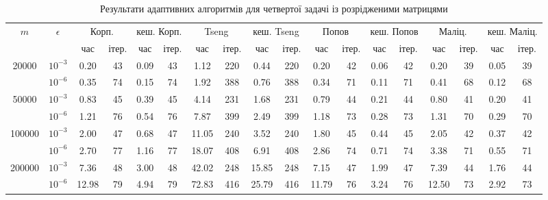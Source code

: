 \begin{table}[H]
    \centering
    \begin{tabular}{||c|c||c|c|c|c||c|c|c|c||c|c|c|c||c|c|c|c||} \hline \hline
        \multirow{2}{*}{$m$} & \multirow{2}{*}{$\epsilon$} & \multicolumn{2}{c|}{Корп.} & \multicolumn{2}{c||}{кеш. Корп.} & \multicolumn{2}{c|}{Tseng} & \multicolumn{2}{c||}{кеш. Tseng} & \multicolumn{2}{c|}{Попов} & \multicolumn{2}{c||}{кеш. Попов} & \multicolumn{2}{c|}{Маліц.} & \multicolumn{2}{c||}{кеш. Маліц.} \\ \cline{3-18}
        & & час & ітер. & час & ітер. & час & ітер. & час & ітер. & час & ітер. & час & ітер. & час & ітер. & час & ітер. \\ \hline \hline
        \multirow{2}{*}{20000} & $10^{-3}$ & 0.20 & 43 & 0.09 & 43 & 1.12 & 220 & 0.44 & 220 & 0.20 & 42 & 0.06 & 42 & 0.20 & 39 & 0.05 & 39 \\ \cline{2-18}
        & $10^{-6}$ & 0.35 & 74 & 0.15 & 74 & 1.92 & 388 & 0.76 & 388 & 0.34 & 71 & 0.11 & 71 & 0.41 & 68 & 0.12 & 68 \\ \hline
        \multirow{2}{*}{50000} & $10^{-3}$ & 0.83 & 45 & 0.39 & 45 & 4.14 & 231 & 1.68 & 231 & 0.79 & 44 & 0.21 & 44 & 0.80 & 41 & 0.20 & 41 \\ \cline{2-18}
        & $10^{-6}$ & 1.21 & 76 & 0.54 & 76 & 7.87 & 399 & 2.49 & 399 & 1.18 & 73 & 0.28 & 73 & 1.31 & 70 & 0.29 & 70 \\ \hline
        \multirow{2}{*}{100000} & $10^{-3}$ & 2.00 & 47 & 0.68 & 47 & 11.05 & 240 & 3.52 & 240 & 1.80 & 45 & 0.44 & 45 & 2.05 & 42 & 0.37 & 42 \\ \cline{2-18}
        & $10^{-6}$ & 2.70 & 77 & 1.16 & 77 & 18.07 & 408 & 6.91 & 408 & 2.86 & 74 & 0.71 & 74 & 3.38 & 71 & 0.55 & 71 \\ \hline
        \multirow{2}{*}{200000} & $10^{-3}$ & 7.36 & 48 & 3.00 & 48 & 42.02 & 248 & 15.85 & 248 & 7.15 & 47 & 1.99 & 47 & 7.39 & 44 & 1.76 & 44 \\ \cline{2-18}
        & $10^{-6}$ & 12.98 & 79 & 4.94 & 79 & 72.83 & 416 & 25.79 & 416 & 11.79 & 76 & 3.24 & 76 & 12.50 & 73 & 2.92 & 73 \\ \hline
        \hline
    \end{tabular}
    \caption{Результати адаптивних алгоритмів для четвертої задачі із розрідженими матрицями}
    \label{tab:4-sparse-adapt}
\end{table}